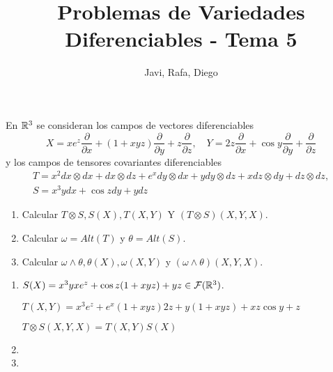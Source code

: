 \documentclass[twoside]{article}
\begin{document}
\title{Problemas de Variedades Diferenciables - Tema 5}
\author{Javi, Rafa, Diego}
\maketitle

\begin{ejercicio}{1}
En $\mathbb{R}^3$ se consideran los campos de vectores diferenciables 
$$X=xe^z\frac{\partial}{\partial x}+(1+xyz)\frac{\partial}{\partial y}+z\frac{\partial}{\partial z},\quad Y=2z\frac{\partial}{\partial x}+\cos{y}\frac{\partial}{\partial y}+\frac{\partial}{\partial z}$$
y los campos de tensores covariantes diferenciables
\begin{gather*}
T=x^2dx\otimes dx+dx\otimes dz+e^xdy\otimes dx +ydy\otimes dz+xdz\otimes dy+dz\otimes dz,\\
S=x^3ydx+\cos{z}dy+ydz
\end{gather*}
\begin{enumerate}
\item Calcular $T\otimes S, S(X),T(X,Y)$ Y $(T\otimes S)(X,Y,X)$.
\item Calcular $\omega=Alt(T)$ y $\theta=Alt(S)$. 
\item Calcular $\omega\land\theta,\theta(X),\omega(X,Y)$ y $(\omega\land\theta)(X,Y,X)$.
\end{enumerate}
\end{ejercicio}
\begin{solucion}
\begin{enumerate}
\item $S(X)=x^3yxe^z+\cos{z}(1+xyz)+yz\in\mathcal{F}(\mathbb{R}^3)$. 

$T(X,Y)=x^3e^z+e^x(1+xyz)2z+y(1+xyz)+xz\cos{y}+z$

$T\otimes S(X,Y,X)=T(X,Y)S(X)$
\item
\item
\end{enumerate}
\end{solucion}

\newpage
\end{document}
